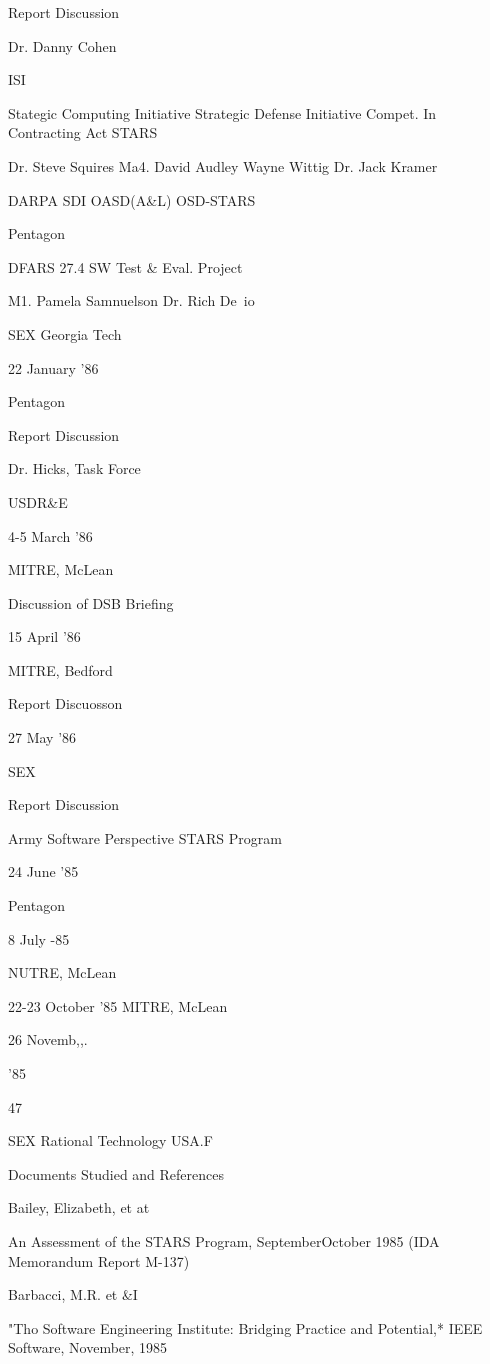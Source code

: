 \documentclass[12pt]{article}
\begin{document}
Report Discussion

Dr. Danny Cohen

ISI

Stategic Computing Initiative
Strategic Defense Initiative
Compet. In Contracting Act
STARS

Dr. Steve Squires
Ma4. David Audley
Wayne Wittig
Dr. Jack Kramer

DARPA
SDI
OASD(A\&L)
OSD-STARS

Pentagon

DFARS 27.4
SW Test \& Eval. Project

M1. Pamela Samnuelson
Dr. Rich De~io

SEX
Georgia Tech

22 January '86

Pentagon

Report Discussion

Dr. Hicks, Task Force

USDR\&E

4-5 March '86

MITRE, McLean

Discussion of DSB Briefing

15 April '86

MITRE, Bedford

Report Discuosson

27 May '86

SEX

Report Discussion

Army Software Perspective
STARS Program

24 June '85

Pentagon

8 July -85

NUTRE, McLean

22-23 October '85 MITRE, McLean

26 Novemb,,.

'85

47

SEX
Rational Technology
USA.F


Documents Studied and References

Bailey, Elizabeth, et at

An Assessment of the STARS Program, SeptemberOctober 1985 (IDA Memorandum Report M-137)

Barbacci, M.R. et \&I

"Tho Software Engineering Institute: Bridging Practice
and Potential,* IEEE Software, November, 1985
\end{document}
